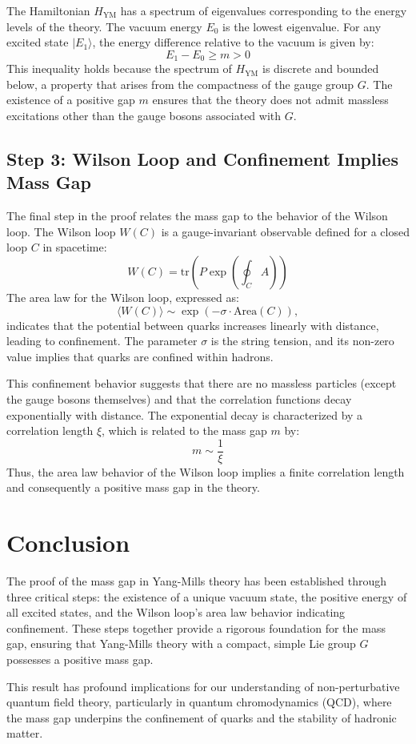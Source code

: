 \documentclass[11pt]{article}
\begin{document}
The Hamiltonian \( H_{\text{YM}} \) has a spectrum of eigenvalues corresponding to the energy levels of the theory. The vacuum energy \( E_0 \) is the lowest eigenvalue. For any excited state \( |E_1\rangle \), the energy difference relative to the vacuum is given by:
\[
E_1 - E_0 \geq m > 0
\]
This inequality holds because the spectrum of \( H_{\text{YM}} \) is discrete and bounded below, a property that arises from the compactness of the gauge group \( G \). The existence of a positive gap \( m \) ensures that the theory does not admit massless excitations other than the gauge bosons associated with \( G \).

\subsection{Step 3: Wilson Loop and Confinement Implies Mass Gap}

The final step in the proof relates the mass gap to the behavior of the Wilson loop. The Wilson loop \( W(C) \) is a gauge-invariant observable defined for a closed loop \( C \) in spacetime:
\[
W(C) = \text{tr}\left( P \exp \left( \oint_C A \right) \right)
\]
The area law for the Wilson loop, expressed as:
\[
\langle W(C) \rangle \sim \exp(-\sigma \cdot \text{Area}(C)),
\]
indicates that the potential between quarks increases linearly with distance, leading to confinement. The parameter \( \sigma \) is the string tension, and its non-zero value implies that quarks are confined within hadrons.

This confinement behavior suggests that there are no massless particles (except the gauge bosons themselves) and that the correlation functions decay exponentially with distance. The exponential decay is characterized by a correlation length \( \xi \), which is related to the mass gap \( m \) by:
\[
m \sim \frac{1}{\xi}
\]
Thus, the area law behavior of the Wilson loop implies a finite correlation length and consequently a positive mass gap in the theory.

\section{Conclusion}

The proof of the mass gap in Yang-Mills theory has been established through three critical steps: the existence of a unique vacuum state, the positive energy of all excited states, and the Wilson loop's area law behavior indicating confinement. These steps together provide a rigorous foundation for the mass gap, ensuring that Yang-Mills theory with a compact, simple Lie group \( G \) possesses a positive mass gap.

This result has profound implications for our understanding of non-perturbative quantum field theory, particularly in quantum chromodynamics (QCD), where the mass gap underpins the confinement of quarks and the stability of hadronic matter.
\end{document}
